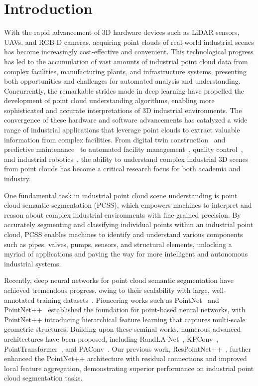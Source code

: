 \documentclass[preprint,12pt]{elsarticle}
\begin{document}
\section{Introduction}
With the rapid advancement of 3D hardware devices such as LiDAR sensors, UAVs, and RGB-D cameras, acquiring point clouds of real-world industrial scenes has become increasingly cost-effective and convenient. This technological progress has led to the accumulation of vast amounts of industrial point cloud data from complex facilities, manufacturing plants, and infrastructure systems, presenting both opportunities and challenges for automated analysis and understanding. Concurrently, the remarkable strides made in deep learning have propelled the development of point cloud understanding algorithms, enabling more sophisticated and accurate interpretations of 3D industrial environments. The convergence of these hardware and software advancements has catalyzed a wide range of industrial applications that leverage point clouds to extract valuable information from complex facilities. From digital twin construction~\cite{misc} and predictive maintenance~\cite{misc} to automated facility management~\cite{misc}, quality control~\cite{misc}, and industrial robotics~\cite{misc,misc}, the ability to understand complex industrial 3D scenes from point clouds has become a critical research focus for both academia and industry.

One fundamental task in industrial point cloud scene understanding is point cloud semantic segmentation (PCSS), which empowers machines to interpret and reason about complex industrial environments with fine-grained precision. By accurately segmenting and classifying individual points within an industrial point cloud, PCSS enables machines to identify and understand various components such as pipes, valves, pumps, sensors, and structural elements, unlocking a myriad of applications and paving the way for more intelligent and autonomous industrial systems.

Recently, deep neural networks for point cloud semantic segmentation have achieved tremendous progress, owing to their scalability with large, well-annotated training datasets~\cite{misc,misc,misc}. Pioneering works such as PointNet~\cite{qi2017pointnet} and PointNet++~\cite{qi2017pointnetpp} established the foundation for point-based neural networks, with PointNet++ introducing hierarchical feature learning that captures multi-scale geometric structures. Building upon these seminal works, numerous advanced architectures have been proposed, including RandLA-Net~\cite{hu2020randlanet}, KPConv~\cite{thomas2019}, PointTransformer~\cite{zhao2021pointtransformer}, and PAConv~\cite{xu2021paconv}. Our previous work, ResPointNet++~\cite{respointnet}, further enhanced the PointNet++ architecture with residual connections and improved local feature aggregation, demonstrating superior performance on industrial point cloud segmentation tasks.
\end{document}
